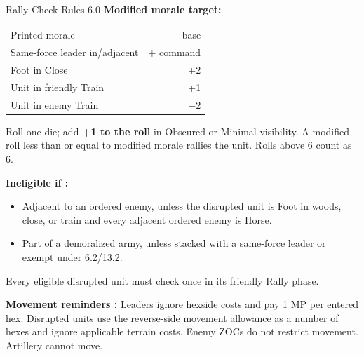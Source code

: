 \begin{minipage}[t]{.49\textwidth}\vspace{0pt}
\begin{aidbox}{Rally Check \hfill \normalfont\small Rules 6.0}
\fontsize{8.1}{9.2}\selectfont
\textbf{Modified morale target:}

\begin{tabularx}{\linewidth}{@{}Xr@{}}
  \toprule
  Printed morale & base \\
  Same-force leader in/adjacent & + command \\
  Foot in Close & +2 \\
  Unit in friendly Train & +1 \\
  Unit in enemy Train & $-2$ \\
  \bottomrule
\end{tabularx}

\smallskip
Roll one die; add \textbf{+1 to the roll} in Obscured or Minimal visibility. A modified roll less than or equal to modified morale rallies the unit. Rolls above 6 count as 6.

\textbf{Ineligible if :}
\begin{itemize}
  \item Adjacent to an ordered enemy, unless the disrupted unit is Foot in woods, close, or train and every adjacent ordered enemy is Horse.
  \item Part of a demoralized army, unless stacked with a same-force leader or exempt under 6.2/13.2.
\end{itemize}

Every eligible disrupted unit must check once in its friendly Rally phase.
\end{aidbox}
\end{minipage}

\vfill
{\footnotesize\color{cvink!80}\textbf{Movement reminders :} Leaders ignore hexside costs and pay 1 MP per entered hex. Disrupted units use the reverse-side movement allowance as a number of hexes and ignore applicable terrain costs. Enemy ZOCs do not restrict movement. Artillery cannot move.}
